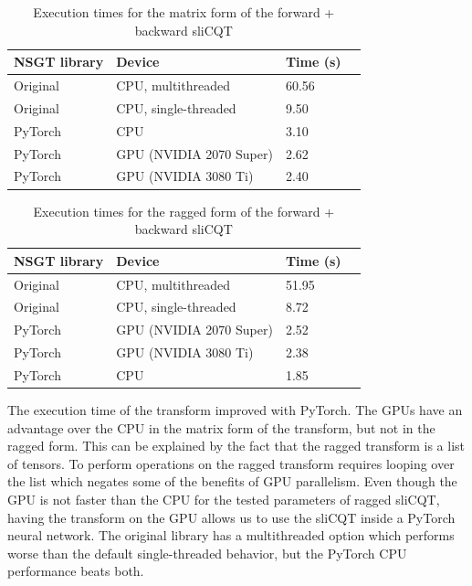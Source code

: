 \documentclass[report.tex]{subfiles}
\begin{document}
\begin{table}[ht]
	\centering
	\caption{Execution times for the matrix form of the forward + backward sliCQT}
	\label{table:nsgttorchresultsmatrix}
	\begin{tabular}{ |l|l|l|l| }
	 \hline
		NSGT library & Device & Time (s) \\
	 \hline
	 \hline
		Original & CPU, multithreaded & 60.56  \\
	 \hline
		Original & CPU, single-threaded & 9.50  \\
	 \hline
		PyTorch & CPU & 3.10  \\
	 \hline
		PyTorch & GPU (NVIDIA 2070 Super) & 2.62 \\
	 \hline
		PyTorch & GPU (NVIDIA 3080 Ti) &  2.40 \\
	 \hline
\end{tabular}
\end{table}

\begin{table}[ht]
	\centering
	\caption{Execution times for the ragged form of the forward + backward sliCQT}
	\label{table:nsgttorchresultsragged}
	\begin{tabular}{ |l|l|l|l| }
	 \hline
		NSGT library & Device & Time (s) \\
	 \hline
	 \hline
		Original & CPU, multithreaded & 51.95  \\
	 \hline
		Original & CPU, single-threaded & 8.72  \\
	 \hline
		PyTorch & GPU (NVIDIA 2070 Super) & 2.52 \\
	 \hline
		PyTorch & GPU (NVIDIA 3080 Ti) &  2.38 \\
	 \hline
		PyTorch & CPU & 1.85  \\
	 \hline
\end{tabular}
\end{table}

The execution time of the transform improved with PyTorch. The GPUs have an advantage over the CPU in the matrix form of the transform, but not in the ragged form. This can be explained by the fact that the ragged transform is a list of tensors. To perform operations on the ragged transform requires looping over the list which negates some of the benefits of GPU parallelism. Even though the GPU is not faster than the CPU for the tested parameters of ragged sliCQT, having the transform on the GPU allows us to use the sliCQT inside a PyTorch neural network. The original library has a multithreaded option which performs worse than the default single-threaded behavior, but the PyTorch CPU performance beats both.
\end{document}
